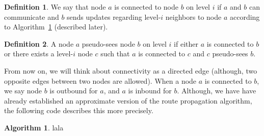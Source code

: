 \documentclass[14pt]{extarticle}
\theoremstyle{definition}
\newtheorem{defn}{Definition}
\newtheorem{algo}{Algorithm}
\begin{document}
\begin{defn}
    We say that node $a$ is connected to node $b$ on level $i$ if $a$ and $b$ can communicate and $b$ sends updates regarding level-$i$ neighbors to node $a$ according to Algorithm~\ref{alg:routes} (described later). 
    \label{defn:connected}
\end{defn}

\begin{defn}
    A node $a$ pseudo-sees node $b$ on level $i$ if either $a$ is connected to $b$ or there exists a level-$i$ node $c$ such that $a$ is connected to $c$ and $c$ pseudo-sees $b$.

    \label{defn:pseudo-vision}
\end{defn}

From now on, we will think about connectivity as a directed edge (although, two opposite edges between two nodes are allowed). When a node $a$ is connected to $b$, we say node $b$ is outbound for $a$, and $a$ is inbound for $b$. Although, we have have already established an approximate version of the route propagation algorithm, the following code describes this more precisely.

\begin{algo}
    lala

    \label{alg:routes}
\end{algo}



\end{document}
